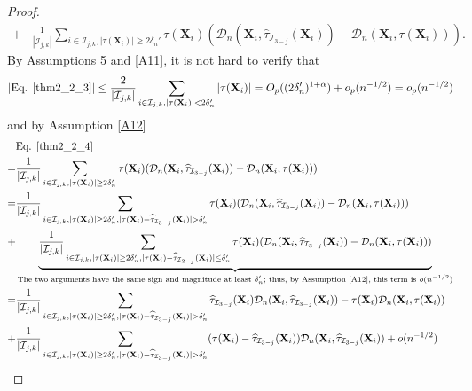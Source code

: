\documentclass[11pt]{article}
\theoremstyle{referenceplain}
\theoremstyle{referencedefinition}
\theoremstyle{referenceremark}
\begin{document}
\begin{proof}
\begin{align}
        +&\frac{1}{|\mathcal{I}_{j,k}|}\sum_{i\in\mathcal{I}_{j,k},|\tau(\mathbf{X}_i)|\ge2\delta_n'}\tau(\mathbf{X}_i)(\mathcal{D}_n(\mathbf{X}_i,\widehat{\tau}_{\mathcal{I}_{3-j}}(\mathbf{X}_i))-\mathcal{D}_n(\mathbf{X}_i,\tau(\mathbf{X}_i))).\label{thm2_2_4}
    \end{align}
     By Assumptions 5 and \ref{A11}, it is not hard to verify that
    \begin{align*}
        |\text{Eq. }\eqref{thm2_2_3}|\leq \frac{2}{|\mathcal{I}_{j,k}|}\sum_{i\in\mathcal{I}_{j,k},|\tau(\mathbf{X}_i)|<2\delta_n'}|\tau(\mathbf{X}_i)|=O_p((2\delta_n')^{1+\alpha})+o_p(n^{-1/2})=o_p(n^{-1/2})
    \end{align*}
    and by Assumption \ref{A12}
    \begin{align*}
        &\text{Eq. }\eqref{thm2_2_4}\\
        =& \frac{1}{|\mathcal{I}_{j,k}|}\sum_{i\in\mathcal{I}_{j,k},|\tau(\mathbf{X}_i)|\ge2\delta_n'}\tau(\mathbf{X}_i)(\mathcal{D}_n(\mathbf{X}_i,\widehat{\tau}_{\mathcal{I}_{3-j}}(\mathbf{X}_i))-\mathcal{D}_n(\mathbf{X}_i,\tau(\mathbf{X}_i)))\\
        =&\frac{1}{|\mathcal{I}_{j,k}|}\sum_{i\in\mathcal{I}_{j,k},|\tau(\mathbf{X}_i)|\ge2\delta_n',|\tau(\mathbf{X}_i)-\widehat{\tau}_{\mathcal{I}_{3-j}}(\mathbf{X}_i)|>\delta_n'}\tau(\mathbf{X}_i)(\mathcal{D}_n(\mathbf{X}_i,\widehat{\tau}_{\mathcal{I}_{3-j}}(\mathbf{X}_i))-\mathcal{D}_n(\mathbf{X}_i,\tau(\mathbf{X}_i)))\\
        +&\underbrace{\frac{1}{|\mathcal{I}_{j,k}|}\sum_{i\in\mathcal{I}_{j,k},|\tau(\mathbf{X}_i)|\ge2\delta_n',|\tau(\mathbf{X}_i)-\widehat{\tau}_{\mathcal{I}_{3-j}}(\mathbf{X}_i)|\leq\delta_n'}\tau(\mathbf{X}_i)(\mathcal{D}_n(\mathbf{X}_i,\widehat{\tau}_{\mathcal{I}_{3-j}}(\mathbf{X}_i))-\mathcal{D}_n(\mathbf{X}_i,\tau(\mathbf{X}_i)))}_{{\text{The two arguments have the same sign and magnitude at least $\delta_n'$; thus, by Assumption \ref{A12}, this term is $o(n^{-1/2})$}}}\\
        =&\frac{1}{|\mathcal{I}_{j,k}|}\sum_{i\in\mathcal{I}_{j,k},|\tau(\mathbf{X}_i)|\ge2\delta_n',|\tau(\mathbf{X}_i)-\widehat{\tau}_{\mathcal{I}_{3-j}}(\mathbf{X}_i)|>\delta_n'}\widehat{\tau}_{\mathcal{I}_{3-j}}(\mathbf{X}_i)\mathcal{D}_n(\mathbf{X}_i,\widehat{\tau}_{\mathcal{I}_{3-j}}(\mathbf{X}_i)) -\tau(\mathbf{X}_i)\mathcal{D}_n(\mathbf{X}_i,\tau(\mathbf{X}_i))\\
        +&\frac{1}{|\mathcal{I}_{j,k}|}\sum_{i\in\mathcal{I}_{j,k},|\tau(\mathbf{X}_i)|\ge2\delta_n',|\tau(\mathbf{X}_i)-\widehat{\tau}_{\mathcal{I}_{3-j}}(\mathbf{X}_i)|>\delta_n'}(\tau(\mathbf{X}_i)-\widehat{\tau}_{\mathcal{I}_{3-j}}(\mathbf{X}_i))\mathcal{D}_n(\mathbf{X}_i,\widehat{\tau}_{\mathcal{I}_{3-j}}(\mathbf{X}_i))+o(n^{-1/2})

\end{align*}
\end{proof}
\end{document}
